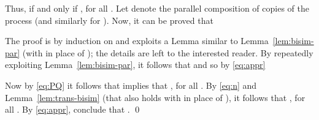 \documentclass{LMCS}
\begin{document}
\medskip

Thus,  if and only if , for all .
Let  denote the parallel composition of  copies of the process  (and similarly for ).
Now, it can be proved that

The proof is by induction on  and exploits a Lemma similar to Lemma~\ref{lem:bisim-par} (with  in
place of ); the details are left to the interested reader.
By repeatedly exploiting Lemma~\ref{lem:bisim-par}, it follows that 
and so by \eqref{eq:appr}

Now by \eqref{eq:PQ} it follows that  implies that , for all .
By \eqref{eq:n} and Lemma~\ref{lem:trans-bisim} (that also holds with  in place of ),
it follows that , for all .
By \eqref{eq:appr}, conclude that .
\qed





\end{document}
